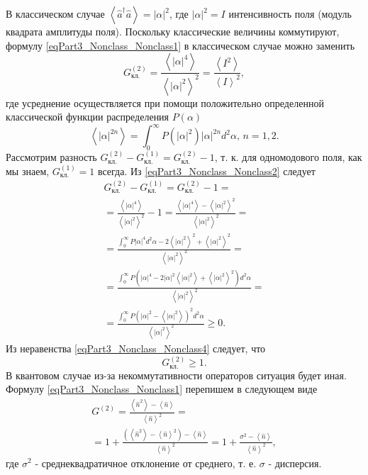 В классическом случае $\left<\hat{a}^{\dag}\hat{a}\right> =
\left|\alpha\right|^2$, где $\left|\alpha\right|^2 = I$ интенсивность
поля (модуль квадрата амплитуды поля). Поскольку классические величины
коммутируют, формулу \eqref{eqPart3_Nonclass_Nonclass1} в классическом
случае можно заменить
\begin{equation}
G^{(2)}_{\mbox{кл.}} = 
\frac{\left<\left|\alpha\right|^4\right>}{\left<\left|\alpha\right|^2\right>^2}
= 
\frac{\left<I^2\right>}{\left<I\right>^2},
\label{eqPart3_Nonclass_Nonclass2}
\end{equation}
где усреднение осуществляется при помощи положительно
определенной классической функции распределения $P\left(\alpha\right)$
\begin{equation}
\left<\left|\alpha\right|^{2n}\right> = 
\int_0^{\infty}P\left(\left|\alpha\right|^2\right)
\left|\alpha\right|^{2n}d^2\alpha, \, n=1,2.
\nonumber
\end{equation}
Рассмотрим разность 
$G^{(2)}_{\mbox{кл.}} - G^{(1)}_{\mbox{кл.}} = G^{(2)}_{\mbox{кл.}} -
1$, т. к. для одномодового поля, как мы знаем, $G^{(1)}_{\mbox{кл.}} =
1$ всегда. Из \eqref{eqPart3_Nonclass_Nonclass2} следует
\begin{eqnarray}
G^{(2)}_{\mbox{кл.}} - G^{(1)}_{\mbox{кл.}} = G^{(2)}_{\mbox{кл.}} -
1 = 
\nonumber \\
=
\frac{\left<\left|\alpha\right|^4\right>}{\left<\left|\alpha\right|^2\right>^2}
- 1 = 
\frac{\left<\left|\alpha\right|^4\right> -
  \left<\left|\alpha\right|^2\right>^2}{\left<\left|\alpha\right|^2\right>^2}
= 
\nonumber \\
= \frac{\int_0^{\infty} P \left|\alpha\right|^4 d^2\alpha - 2
  \left<\left|\alpha\right|^2\right>^2 +
  \left<\left|\alpha\right|^2\right>^2}{\left<\left|\alpha\right|^2\right>^2}
= 
\nonumber \\
= 
\frac{\int_0^{\infty} P \left(\left|\alpha\right|^4  - 2
  \left|\alpha\right|^2
  \left<\left|\alpha\right|^2\right> +
  \left<\left|\alpha\right|^2\right>^2\right)d^2\alpha}
     {\left<\left|\alpha\right|^2\right>^2}
=
\nonumber \\
=
\frac{\int_0^{\infty} P \left(\left|\alpha\right|^2  - 
  \left<\left|\alpha\right|^2\right>\right)^2d^2\alpha}{\left<\left|\alpha\right|^2\right>^2}
\ge 0.
\label{eqPart3_Nonclass_Nonclass4}
\end{eqnarray}
Из неравенства \eqref{eqPart3_Nonclass_Nonclass4} следует, что
\begin{equation}
G^{(2)}_{\mbox{кл.}} \ge 1.
\nonumber
\end{equation}
В квантовом случае из-за некоммутативности операторов ситуация будет
иная. Формулу \eqref{eqPart3_Nonclass_Nonclass1} перепишем в следующем
виде
\begin{eqnarray}
G^{(2)} = \frac{\left<\hat{n}^2\right> - \left<\hat{n}\right>}{\left<\hat{n}\right>^2} = 
\nonumber \\
=
1 + \frac{\left(\left<\hat{n}^2\right> - \left<\hat{n}\right>^2\right) -
  \left<\hat{n}\right>}{\left<\hat{n}\right>^2} = 1 + \frac{\sigma^2 -
  \left<\hat{n}\right>}{\left<\hat{n}\right>^2}, 
\label{eqPart3_Nonclass_Nonclass6}
\end{eqnarray}
где $\sigma^2$ - среднеквадратичное отклонение от среднего,
т. е. $\sigma$ - дисперсия. 

